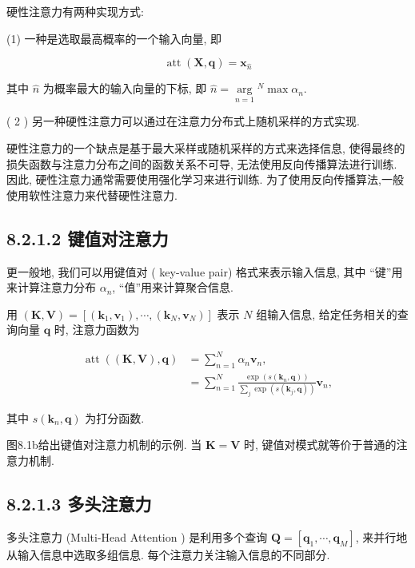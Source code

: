 \documentclass[10pt]{article}
\begin{document}
硬性注意力有两种实现方式:

(1) 一种是选取最高概率的一个输入向量, 即


\begin{equation*}
\operatorname{att}(\boldsymbol{X}, \boldsymbol{q})=\boldsymbol{x}_{\hat{n}} \tag{8.8}
\end{equation*}


其中 $\hat{n}$ 为概率最大的输入向量的下标, 即 $\hat{n}=\underset{n=1}{\arg }{ }^{N} \max \alpha_{n}$.

( 2 ) 另一种硬性注意力可以通过在注意力分布式上随机采样的方式实现.

硬性注意力的一个缺点是基于最大采样或随机采样的方式来选择信息, 使得最终的损失函数与注意力分布之间的函数关系不可导, 无法使用反向传播算法进行训练. 因此, 硬性注意力通常需要使用强化学习来进行训练. 为了使用反向传播算法,一般使用软性注意力来代替硬性注意力.

\subsection*{8.2.1.2 键值对注意力}
更一般地, 我们可以用键值对 ( key-value pair) 格式来表示输入信息, 其中 “键”用来计算注意力分布 $\alpha_{n}$, “值”用来计算聚合信息.

用 $(\boldsymbol{K}, \boldsymbol{V})=\left[\left(\boldsymbol{k}_{1}, \boldsymbol{v}_{1}\right), \cdots,\left(\boldsymbol{k}_{N}, \boldsymbol{v}_{N}\right)\right]$ 表示 $N$ 组输入信息, 给定任务相关的查询向量 $\boldsymbol{q}$ 时, 注意力函数为


\begin{align*}
\operatorname{att}((\boldsymbol{K}, \boldsymbol{V}), \boldsymbol{q}) & =\sum_{n=1}^{N} \alpha_{n} \boldsymbol{v}_{n},  \tag{8.9}\\
& =\sum_{n=1}^{N} \frac{\exp \left(s\left(\boldsymbol{k}_{n}, \boldsymbol{q}\right)\right)}{\sum_{j} \exp \left(s\left(\boldsymbol{k}_{j}, \boldsymbol{q}\right)\right)} \boldsymbol{v}_{n}, \tag{8.10}
\end{align*}


其中 $s\left(\boldsymbol{k}_{n}, \boldsymbol{q}\right)$ 为打分函数.

图8.1b给出键值对注意力机制的示例. 当 $\boldsymbol{K}=\boldsymbol{V}$ 时, 键值对模式就等价于普通的注意力机制.

\subsection*{8.2.1.3 多头注意力}
多头注意力 (Multi-Head Attention ) 是利用多个查询 $\boldsymbol{Q}=\left[\boldsymbol{q}_{1}, \cdots, \boldsymbol{q}_{M}\right]$, 来并行地从输入信息中选取多组信息. 每个注意力关注输入信息的不同部分.
\end{document}
